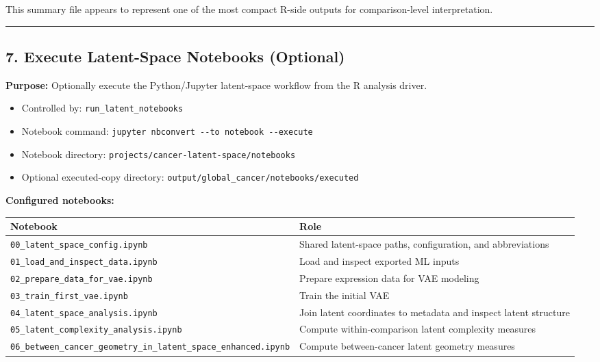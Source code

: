 \documentclass[
  letterpaper,
  DIV=11,
  numbers=noendperiod,
  openany,
  oneside]{scrreprt}
\providecommand{\tightlist}{%
  \setlength{\itemsep}{0pt}\setlength{\parskip}{0pt}}
\begin{document}
This summary file appears to represent one of the most compact R-side
outputs for comparison-level interpretation.

\begin{center}\rule{0.5\linewidth}{0.5pt}\end{center}

\subsection*{7. Execute Latent-Space Notebooks
(Optional)}\label{execute-latent-space-notebooks-optional}

\textbf{Purpose:} Optionally execute the Python/Jupyter latent-space
workflow from the R analysis driver.

\begin{itemize}
\tightlist
\item
  Controlled by: \texttt{run\_latent\_notebooks}
\item
  Notebook command:
  \texttt{jupyter\ nbconvert\ -\/-to\ notebook\ -\/-execute}
\item
  Notebook directory: \texttt{projects/cancer-latent-space/notebooks}
\item
  Optional executed-copy directory:
  \texttt{output/global\_cancer/notebooks/executed}
\end{itemize}

\textbf{Configured notebooks:}

\begin{longtable}[]{@{}
  >{\raggedright\arraybackslash}p{}
  >{\raggedright\arraybackslash}p{}@{}}
\toprule\noalign{}
\begin{minipage}[b]{\linewidth}\raggedright
Notebook
\end{minipage} & \begin{minipage}[b]{\linewidth}\raggedright
Role
\end{minipage} \\
\midrule\noalign{}
\endhead
\bottomrule\noalign{}
\endlastfoot
\texttt{00\_latent\_space\_config.ipynb} & Shared latent-space paths,
configuration, and abbreviations \\
\texttt{01\_load\_and\_inspect\_data.ipynb} & Load and inspect exported
ML inputs \\
\texttt{02\_prepare\_data\_for\_vae.ipynb} & Prepare expression data for
VAE modeling \\
\texttt{03\_train\_first\_vae.ipynb} & Train the initial VAE \\
\texttt{04\_latent\_space\_analysis.ipynb} & Join latent coordinates to
metadata and inspect latent structure \\
\texttt{05\_latent\_complexity\_analysis.ipynb} & Compute
within-comparison latent complexity measures \\
\texttt{06\_between\_cancer\_geometry\_in\_latent\_space\_enhanced.ipynb}
& Compute between-cancer latent geometry measures \\
\end{longtable}
\end{document}
